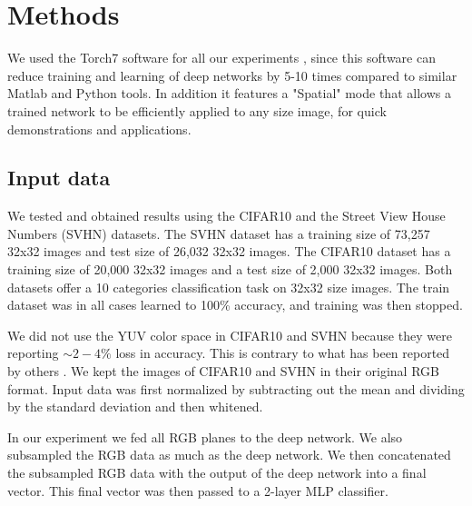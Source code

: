 \documentclass{article} %
\begin{document}
\section{Methods}
\label{sec-methods}


We used the Torch7 software for all our experiments \cite{collobert_torch7_2011}, since this software can reduce training and learning of deep networks by 5-10 times compared to similar Matlab and Python tools. In addition it features a "Spatial" mode that allows a trained network to be efficiently applied to any size image, for quick demonstrations and applications.


\subsection{Input data}

We tested and obtained results using the CIFAR10 \cite{krizhevsky_learning_2009} and the Street View House Numbers (SVHN) \cite{netzer_reading_2011} datasets. The SVHN dataset has a training size of 73,257 32x32 images and test size of 26,032 32x32 images. The CIFAR10 dataset has a training size of 20,000 32x32 images and a test size of 2,000 32x32 images. Both datasets offer a 10 categories classification task on 32x32 size images. The train dataset was in all cases learned to 100\% accuracy, and training was then stopped. 


We did not use the YUV color space in CIFAR10 and SVHN because they were reporting $\sim 2-4\%$ loss in accuracy. This is contrary to what has been reported by others \cite{jarrett_what_2009}. We kept the images of CIFAR10 and SVHN in their original RGB format. Input data was first normalized by subtracting out the mean and dividing by the standard deviation and then whitened.

In our experiment we fed all RGB planes to the deep network. We also subsampled the RGB data as much as the deep network. We then concatenated the subsampled RGB data with the output of the deep network into a final vector. This final vector was then passed to a 2-layer MLP classifier. 
\end{document}
